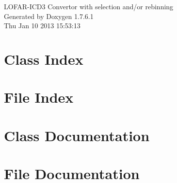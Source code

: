 \documentclass[a4paper]{book}
\begin{document}
\begin{titlepage}
\vspace*{7cm}
\begin{center}
{\Large \-L\-O\-F\-A\-R-\/\-I\-C\-D3 \-Convertor with selection and/or rebinning }\\
\vspace*{1cm}
{\large \-Generated by Doxygen 1.7.6.1}\\
\vspace*{0.5cm}
{\small Thu Jan 10 2013 15:53:13}\\
\end{center}
\end{titlepage}
\clearemptydoublepage
{}
\tableofcontents
\clearemptydoublepage
{}
\chapter{\-Class \-Index}

\chapter{\-File \-Index}

\chapter{\-Class \-Documentation}





\chapter{\-File \-Documentation}






\printindex
\end{document}
